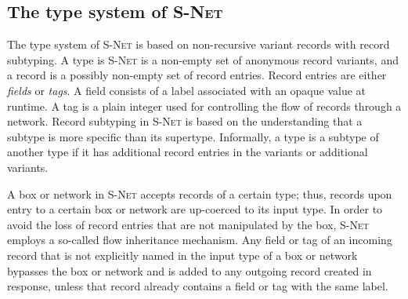     \subsection*{The type system of \textsc{S-Net}}
The type system of \textsc{S-Net} is based on non-recursive variant records with record subtyping. A type is \textsc{S-Net} is a non-empty set of anonymous record variants, and a record is a possibly non-empty set of record entries. Record entries are either \emph{fields} or \emph{tags}. A field consists of a label associated with an opaque value at runtime. A tag is a plain integer used for controlling the flow of records through a network. Record subtyping in \textsc{S-Net} is based on the understanding that a subtype is more specific than its supertype. Informally, a type is a subtype of another type if it has additional record entries in the variants or additional variants.

A box or network in \textsc{S-Net} accepts records of a certain type; thus, records upon entry to a certain box or network are up-coerced to its input type. In order to avoid the loss of record entries that are not manipulated by the box, \textsc{S-Net} employs a so-called flow inheritance mechanism. Any field or tag of an incoming record that is not explicitly named in the input type of a box or network bypasses the box or network and is added to any outgoing record created in response, unless that record already contains a field or tag with the same label.


